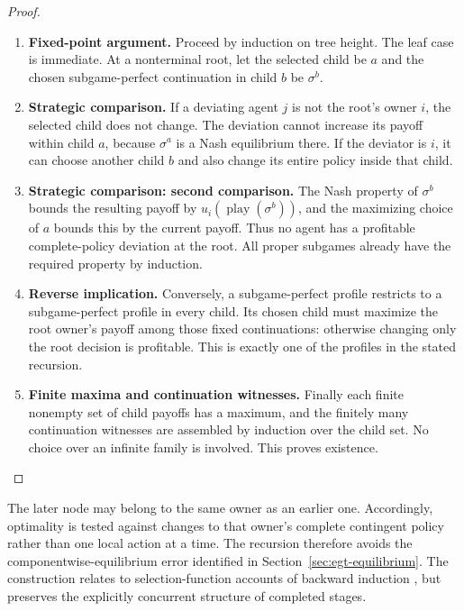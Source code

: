 \documentclass[11pt,a4paper]{article}
\numberwithin{equation}{section}
\theoremstyle{definition}
\theoremstyle{remark}
\theoremstyle{plain}
\begin{document}
\begin{proof}
\leavevmode
\begin{enumerate}[label=\textup{(\arabic*)},leftmargin=*,itemsep=4pt,topsep=3pt]
  \item \textbf{Fixed-point argument.} Proceed by induction on tree height. The leaf case is immediate. At a nonterminal root, let the selected child be $a$ and the chosen
subgame-perfect continuation in child $b$ be $\sigma^b$.
  \item \textbf{Strategic comparison.} If a deviating agent $j$ is not the root's owner $i$, the selected child
does not change. The deviation cannot increase its payoff within child
$a$, because $\sigma^a$ is a Nash equilibrium there. If the deviator is
$i$, it can choose another child $b$ and also change its entire policy
inside that child.
  \item \textbf{Strategic comparison: second comparison.} The Nash property of $\sigma^b$ bounds the resulting
payoff by $u_i(\operatorname{play}(\sigma^b))$, and the maximizing choice
of $a$ bounds this by the current payoff. Thus no agent has a profitable
complete-policy deviation at the root. All proper subgames already have
the required property by induction.
  \item \textbf{Reverse implication.} Conversely, a subgame-perfect profile restricts to a subgame-perfect
profile in every child. Its chosen child must maximize the root owner's
payoff among those fixed continuations: otherwise changing only the
root decision is profitable. This is exactly one of the profiles in
the stated recursion.
  \item \textbf{Finite maxima and continuation witnesses.} Finally each finite nonempty set of child payoffs has a maximum, and the
finitely many continuation witnesses are assembled by induction over the
child set. No choice over an infinite family is involved. This proves
existence.
\end{enumerate}
\end{proof}


The later node may belong to the same owner as an earlier one.
Accordingly, optimality is tested against changes to that owner's
complete contingent policy rather than one local action at a time.
The recursion therefore avoids the componentwise-equilibrium error
identified in Section~\ref{sec:egt-equilibrium}. The construction
relates to selection-function accounts of backward induction
\citep{EscardoOliva2010}, but preserves the explicitly concurrent
structure of completed stages.
\end{document}
